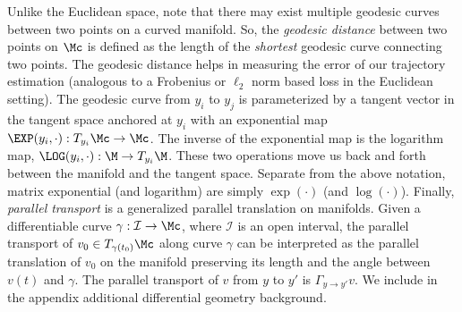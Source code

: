Unlike the Euclidean space, note that there may exist multiple geodesic curves between two points on a curved manifold. 
So, the \textit{geodesic distance}
between two points on $\Mc$ is defined as the length of the {\em shortest} geodesic curve connecting two points.
The geodesic distance helps in measuring the error of our trajectory estimation (analogous to a Frobenius or $\ell_2$ norm based loss in the Euclidean setting).
The geodesic curve from $y_i$ to $y_j$  is parameterized by a tangent vector in the tangent space anchored at $y_i$ with an exponential map $\EXP(y_i,\cdot ): T_{y_i}\Mc \rightarrow \Mc$. 
The inverse of the exponential map is the logarithm map, $\LOG(y_i,\cdot):\M \rightarrow T_{y_i}\M$. These two operations move us back and forth between 
the manifold and the tangent space. 
Separate from the above notation, matrix exponential (and logarithm) are simply $\exp(\cdot)$ (and $\log(\cdot)$).  
Finally, \textit{parallel transport} is a generalized parallel translation on manifolds. Given a differentiable curve $\gamma : \mathcal{I} \rightarrow  \Mc$, where $\mathcal{I}$ is an open interval, 
the parallel transport of $v_0 \in T_{\gamma(t_0)}\Mc$ along curve $\gamma$ can be interpreted as the parallel translation of $v_0$ on the manifold preserving its length and the angle between $v (t)$ and $\gamma$. 
The parallel transport of $v$ from $y$ to $y'$ is $\Gamma_{y\rightarrow y'}v$.
We include in the appendix additional differential geometry background.


